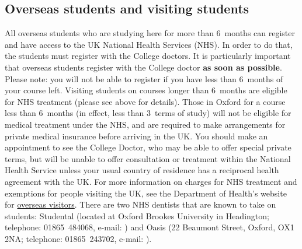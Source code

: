 \documentclass[a4paper,fleqn,12pt]{book} %
\begin{document}
\subsection{Overseas students and visiting students}
All overseas students who are studying here for more than 6~months can register
and have access to the UK National Health Services (NHS). In order to do that,
the students must register with the College doctors. It is particularly
important that overseas students register with the College doctor {\textbf{as soon as possible}}. Please note: you will not be able to register if you have less than 6~months of your course left.
Visiting students on courses longer than 6~months are eligible for NHS treatment (please see above for details). Those in Oxford for a course less than 6~months (in effect, less than 3~terms of study) will not be eligible for medical treatment under the NHS, and are required to make arrangements for private medical insurance before arriving in the UK.
You should make an appointment to see the College Doctor, who may be able to offer special private terms, but will be unable to offer consultation or treatment within the National Health Service unless your usual country of  residence has a reciprocal health agreement with the UK.
For more information on charges for NHS treatment and exemptions for people
visiting the UK, see the Department of Health's website for
\href{http://www.nhs.uk/chq/pages/1086.aspx?categoryid=68}{overseas visitors}.
There are two NHS dentists that are known to take on students: Studental (located at Oxford Brookes University in Headington; telephone: 01865~484068, e-mail: \href{mailto:reception@studental.co.uk}{}) and Oasis (22 Beaumont Street, Oxford, OX1 2NA; telephone: 01865~243702, e-mail: \href{mailto:reception.oxford@oasis-healthcare.com}{}).
\end{document}
